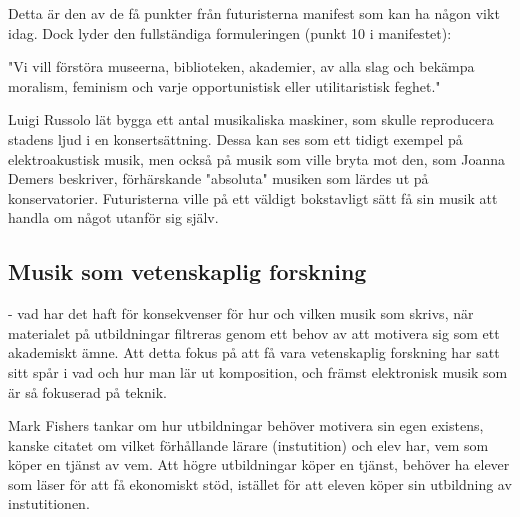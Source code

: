 \documentclass{article}
\begin{document}
  Detta är den av de få
  punkter från futuristerna manifest som kan ha någon vikt idag. Dock lyder den fullständiga formuleringen
  (punkt 10 i manifestet):

  "Vi vill förstöra museerna, biblioteken, akademier, av alla slag och bekämpa moralism, feminism och varje
  opportunistisk eller utilitaristisk feghet."

  Luigi Russolo lät bygga ett antal musikaliska maskiner, som skulle reproducera stadens ljud i en
  konsertsättning. Dessa kan ses som ett tidigt exempel på elektroakustisk musik, men också på musik som ville
  bryta mot den, som Joanna Demers beskriver, förhärskande "absoluta" musiken som lärdes ut på
  konservatorier. Futuristerna ville på ett väldigt bokstavligt sätt få sin musik att handla om något utanför
  sig själv. 








\subsection{Musik som vetenskaplig forskning}
- vad har det haft för konsekvenser för hur och vilken musik som skrivs, när materialet på utbildningar filtreras
  genom ett behov av att motivera sig som ett akademiskt ämne. Att detta fokus på att få vara vetenskaplig
  forskning har satt sitt spår i vad och hur man lär ut komposition, och främst elektronisk musik som är så
  fokuserad på teknik. 

  Mark Fishers tankar om hur utbildningar behöver motivera sin egen existens, kanske citatet om vilket
  förhållande lärare (instutition) och elev har, vem som köper en tjänst av vem. Att högre utbildningar
  köper en tjänst, behöver ha elever som läser för att få ekonomiskt stöd, istället för att eleven köper sin
  utbildning av instutitionen. 
\end{document}
